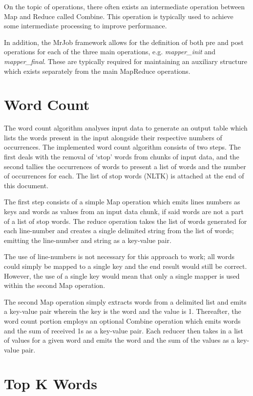 \documentclass[journal,10pt]{IEEEtran}
\begin{document}
On the topic of operations, there often exists an intermediate operation between Map and Reduce called Combine. This operation is typically used to achieve some intermediate processing to improve performance.

In addition, the MrJob framework allows for the definition of both pre and post operations for each of the three main operations, e.g. \textit{mapper\_init} and \textit{mapper\_final}. These are typically required for maintaining an auxiliary structure which exists separately from the main MapReduce operations.


\section{Word Count}

The word count algorithm analyses input data to generate an output table which lists the words present in the input alongside their respective numbers of occurrences. The implemented word count algorithm consists of two steps. The first deals with the removal of `stop' words from chunks of input data, and the second tallies the occurrences of words to present a list of words and the number of occurrences for each. The list of stop words (NLTK) is attached at the end of this document.

The first step consists of a simple Map operation which emits lines numbers as keys and words as values from an input data chunk, if said words are not a part of a list of stop words. The reduce operation takes the list of words generated for each line-number and creates a single delimited string from the list of words; emitting the line-number and string as a key-value pair.

The use of line-numbers is not necessary for this approach to work; all words could simply be mapped to a single key and the end result would still be correct. However, the use of a single key would mean that only a single mapper is used within the second Map operation.

The second Map operation simply extracts words from a delimited list and emits a key-value pair wherein the key is the word and the value is 1. Thereafter, the word count portion employs an optional Combine operation which emits words and the sum of received 1s as a key-value pair. Each reducer then takes in a list of values for a given word and emits the word and the sum of the values as a key-value pair.


\section{Top K Words}
\end{document}
